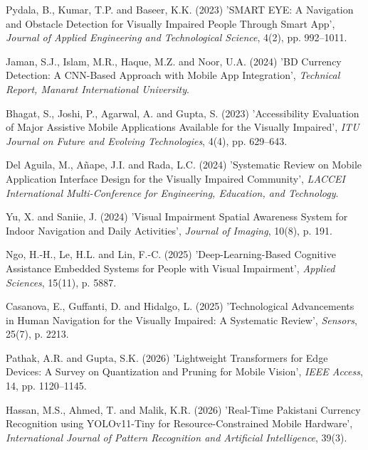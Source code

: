 \documentclass[12pt,a4paper]{report}
\begin{document}
\begin{enumerate}[label={[\arabic*]}, leftmargin=3em, itemsep=1em]
    \item Pydala, B., Kumar, T.P. and Baseer, K.K. (2023) 'SMART EYE: A Navigation and Obstacle Detection for Visually Impaired People Through Smart App', \textit{Journal of Applied Engineering and Technological Science}, 4(2), pp. 992--1011.
 
    \item Jaman, S.J., Islam, M.R., Haque, M.Z. and Noor, U.A. (2024) 'BD Currency Detection: A CNN-Based Approach with Mobile App Integration', \textit{Technical Report, Manarat International University}.
 
    \item Bhagat, S., Joshi, P., Agarwal, A. and Gupta, S. (2023) 'Accessibility Evaluation of Major Assistive Mobile Applications Available for the Visually Impaired', \textit{ITU Journal on Future and Evolving Technologies}, 4(4), pp. 629--643.
 
    \item Del Aguila, M., Añape, J.I. and Rada, L.C. (2024) 'Systematic Review on Mobile Application Interface Design for the Visually Impaired Community', \textit{LACCEI International Multi-Conference for Engineering, Education, and Technology}.
 
    \item Yu, X. and Saniie, J. (2024) 'Visual Impairment Spatial Awareness System for Indoor Navigation and Daily Activities', \textit{Journal of Imaging}, 10(8), p. 191.
 
    \item Ngo, H.-H., Le, H.L. and Lin, F.-C. (2025) 'Deep-Learning-Based Cognitive Assistance Embedded Systems for People with Visual Impairment', \textit{Applied Sciences}, 15(11), p. 5887.
 
    \item Casanova, E., Guffanti, D. and Hidalgo, L. (2025) 'Technological Advancements in Human Navigation for the Visually Impaired: A Systematic Review', \textit{Sensors}, 25(7), p. 2213.
 
    \item Pathak, A.R. and Gupta, S.K. (2026) 'Lightweight Transformers for Edge Devices: A Survey on Quantization and Pruning for Mobile Vision', \textit{IEEE Access}, 14, pp. 1120--1145.
 
    \item Hassan, M.S., Ahmed, T. and Malik, K.R. (2026) 'Real-Time Pakistani Currency Recognition using YOLOv11-Tiny for Resource-Constrained Mobile Hardware', \textit{International Journal of Pattern Recognition and Artificial Intelligence}, 39(3).
 

\end{enumerate}
\end{document}
